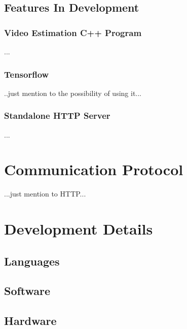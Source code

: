 \documentclass{scrreprt}
\begin{document}
\section{Features In Development}

\subsection{Video Estimation C++ Program}

...
\subsection{Tensorflow}

..just mention to the possibility of using it...

\subsection{Standalone HTTP Server}

...

\chapter{Communication Protocol}

...just mention to HTTP...


\chapter{Development Details}

\section{Languages}
\section{Software}
\section{Hardware}
\end{document}
